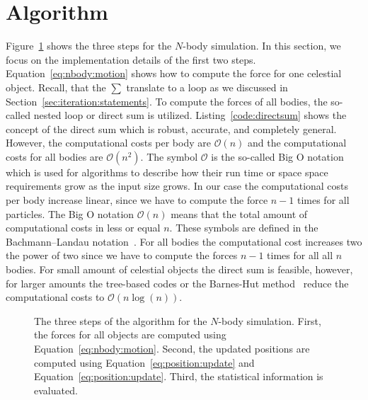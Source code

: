 \section{Algorithm}
Figure~\ref{fig:nbody:algorithm} shows the three steps for the $N$-body simulation. In this section, we focus on the implementation details of the first two steps. Equation~\ref{eq:nbody:motion} shows how to compute the force for one celestial object. Recall, that the $\sum$ translate to a  loop as we discussed in Section~\ref{sec:iteration:statements}. To compute the forces of all bodies, the so-called nested  loop or direct sum is utilized. Listing~\ref{code:directsum} shows the concept of the direct sum which is robust, accurate, and completely general. However, the computational costs per body are $\mathcal{O}(n)$ and the computational costs for all bodies are $\mathcal{O}(n^2)$. The symbol $\mathcal{O}$ is the so-called Big O notation which is used for algorithms to describe how their run time or space space requirements grow as the input size grows. In our case the computational costs per body increase linear, since we have to compute the force $n-1$ times for all particles. The Big O notation $\mathcal{O}(n)$ means that the total amount of computational costs in less or equal $n$. These symbols are defined in the Bachmann–Landau notation~\cite{bachmann1894analytische,landau2000handbuch,knuth1997art}. For all bodies the computational cost increases two the power of two since we have to compute the forces $n-1$ times for all all $n$ bodies. For small amount of celestial objects the direct sum is feasible, however, for larger amounts the tree-based codes or the Barnes-Hut method~\cite{barnes1986hierarchical} reduce the computational costs to $\mathcal{O}(n\log(n))$. \\

\begin{figure}[tb]
\centering
{}
\caption{The three steps of the algorithm for the $N$-body simulation. First, the forces for all objects are computed using Equation~\ref{eq:nbody:motion}. Second, the updated positions are computed using Equation~\ref{eq:position:update} and Equation~\ref{eq:position:update}. Third, the statistical information is evaluated.  }
\label{fig:nbody:algorithm}
\end{figure}


